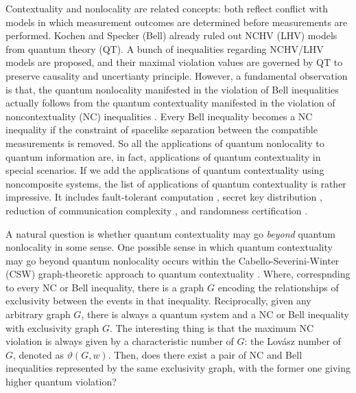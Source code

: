 \documentclass[prl,letterpaper,english,reprint,nofootinbib,aps,superscriptaddress,showpacs,showkeys]{revtex4-1}
\theoremstyle{definition}
\theoremstyle{remark}
\begin{document}
Contextuality and nonlocality are related concepts: both reflect conflict with models in which measurement outcomes are determined before measurements are performed. 
Kochen and Specker \cite{Specker60, KS67} (Bell) \cite{Bell66} already ruled out NCHV (LHV) models from quantum theory (QT).
A bunch of inequalities regarding NCHV/LHV models are proposed, and their maximal violation values are governed by QT to preserve causality and uncertianty principle.
However, a fundamental observation is that, the quantum nonlocality manifested in the violation of Bell inequalities \cite{Bell64} actually follows from the quantum contextuality manifested in the violation of noncontextuality (NC) inequalities \cite{KCBS08,Cabello08}. 
Every Bell inequality becomes a NC inequality if the constraint of spacelike separation between the compatible measurements is removed.
So all the applications of quantum nonlocality to quantum information are, in fact, applications of quantum contextuality in special scenarios. If we add the applications of quantum contextuality using noncomposite systems, the list of applications of quantum contextuality is rather impressive. 
It includes fault-tolerant computation \cite{Raussendorf13,HWVE13}, secret key distribution \cite{Ekert91,CDNS11}, reduction of communication complexity \cite{BZPZ04,BCMW10}, and randomness certification \cite{PAMBMMOHLMM10,UZZWYDDK13}.

A natural question is whether quantum contextuality may go {\em beyond} quantum nonlocality in some sense.
One possible sense in which quantum contextuality may go beyond quantum nonlocality occurs within the Cabello-Severini-Winter (CSW) graph-theoretic approach to quantum contextuality \cite{CSW10,CSW14}.
Where, correspnding to every NC or Bell inequality, there is a graph $G$ encoding the relationships of exclusivity between the events in that inequality. 
Reciprocally, given any arbitrary graph $G$, there is always a quantum system and a NC or Bell inequality with exclusivity graph $G$. The interesting thing is that the maximum NC violation is always given by a characteristic number of $G$: the Lov\'asz number of $G$, denoted as $\vartheta(G,w)$. Then, does there exist a pair of NC and Bell inequalities represented by the same exclusivity graph, with the former one giving higher quantum violation?
\end{document}

